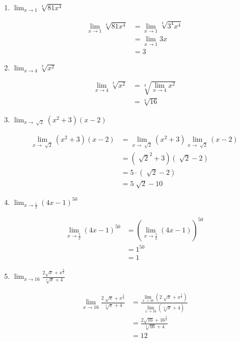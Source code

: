 \documentclass[a4paper, 12pt]{article}
\begin{document}
\begin{enumerate}
\begin{enumerate}
        \item $\lim_{x \to 1} \sqrt[4]{81x^4}$
        
        \begin{align*}
            \lim_{x \to 1} \sqrt[4]{81x^4} &= \lim_{x \to 1} \sqrt[4]{3^4x^4}\\
            &= \lim_{x \to 1} 3x \tag*{[l. pol.]}\\
            &= 3
        \end{align*}

        \item $\lim_{x \to 4} \sqrt[3]{x^2}$
        
        \begin{align*}
            \lim_{x \to 4} \sqrt[3]{x^2} &= \sqrt[3]{\lim_{x \to 4}x^2} \tag*{[l. raíz]}\\
            &= \sqrt[3]{16} \tag*{[l. pol.]}
        \end{align*}

        \item $\lim_{x \to \sqrt[]{2}} (x^2 + 3) (x-2)$
        
        \begin{align*}
            \lim_{x \to \sqrt[]{2}} (x^2 + 3) (x-2) &= \lim_{x \to \sqrt[]{2}}(x^2 + 3) \lim_{x \to \sqrt[]{2}}(x-2) \tag*{[l. prod.]} \\
            &= (\sqrt[]{2}^2 + 3) (\sqrt[]{2}-2) \tag*{[l. pol.]} \\
            &= 5 \cdot (\sqrt[]{2} -2) \\
            &= 5\sqrt[]{2} - 10
        \end{align*}

        \item $\lim_{x \to \frac{1}{2}} (4x-1)^50$
        
        \begin{align*}
            \lim_{x \to \frac{1}{2}} (4x-1)^{50} &= \left( \lim_{x \to \frac{1}{2}}(4x-1) \right)^{50} \tag*{[l. pot.]}\\
            &= 1^{50} \tag*{[l. pol.]}\\
            &= 1
        \end{align*}

        \item $\lim_{x \to 16} \frac{2\sqrt{x} + x^{\frac{3}{2}}}{\sqrt[4]{x} + 4}$
        
        \begin{align*}
            \lim_{x \to 16} \frac{2\sqrt[]{x} + x^{\frac{3}{2}}}{\sqrt[4]{x} + 4} &= \frac{\lim_{x \to 16}(2\sqrt[]{x} + x^{\frac{3}{2}})}{\lim_{x \to 16}(\sqrt[4]{x} + 4)} \tag*{[l. quo.]}\\
            &= \frac{2\sqrt{16} + 16^{\frac{3}{2}}}{\sqrt[4]{16} + 4} \tag*{[l. pol.]}\\
            &= 12
        \end{align*}


\end{enumerate}
\end{enumerate}
\end{document}
